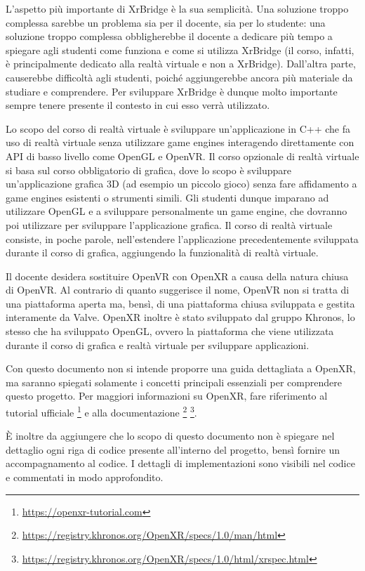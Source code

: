 \documentclass[twoside]{supsistudent}
\begin{document}
L'aspetto più importante di XrBridge è la sua semplicità. Una soluzione troppo complessa sarebbe un problema sia per il docente, sia per lo studente: una soluzione troppo complessa obbligherebbe il docente a dedicare più tempo a spiegare agli studenti come funziona e come si utilizza XrBridge (il corso, infatti, è principalmente dedicato alla realtà virtuale e non a XrBridge). Dall'altra parte, causerebbe difficoltà agli studenti, poiché aggiungerebbe ancora più materiale da studiare e comprendere. Per sviluppare XrBridge è dunque molto importante sempre tenere presente il contesto in cui esso verrà utilizzato.

Lo scopo del corso di realtà virtuale è sviluppare un'applicazione in C++ che fa uso di realtà virtuale senza utilizzare game engines interagendo direttamente con API di basso livello come OpenGL e OpenVR. Il corso opzionale di realtà virtuale si basa sul corso obbligatorio di grafica, dove lo scopo è sviluppare un'applicazione grafica 3D (ad esempio un piccolo gioco) senza fare affidamento a game engines esistenti o strumenti simili. Gli studenti dunque imparano ad utilizzare OpenGL e a sviluppare personalmente un game engine, che dovranno poi utilizzare per sviluppare l'applicazione grafica. Il corso di realtà virtuale consiste, in poche parole, nell'estendere l'applicazione precedentemente sviluppata durante il corso di grafica, aggiungendo la funzionalità di realtà virtuale.

Il docente desidera sostituire OpenVR con OpenXR a causa della natura chiusa di OpenVR. Al contrario di quanto suggerisce il nome, OpenVR non si tratta di una piattaforma aperta ma, bensì, di una piattaforma chiusa sviluppata e gestita interamente da Valve. OpenXR inoltre è stato sviluppato dal gruppo Khronos, lo stesso che ha sviluppato OpenGL, ovvero la piattaforma che viene utilizzata durante il corso di grafica e realtà virtuale per sviluppare applicazioni.

Con questo documento non si intende proporre una guida dettagliata a OpenXR, ma saranno spiegati solamente i concetti principali essenziali per comprendere questo progetto. Per maggiori informazioni su OpenXR, fare riferimento al tutorial ufficiale \footnote{\url{https://openxr-tutorial.com}} e alla documentazione \footnote{\url{https://registry.khronos.org/OpenXR/specs/1.0/man/html}} \footnote{\url{https://registry.khronos.org/OpenXR/specs/1.0/html/xrspec.html}}.

È inoltre da aggiungere che lo scopo di questo documento non è spiegare nel dettaglio ogni riga di codice presente all'interno del progetto, bensì fornire un accompagnamento al codice. I dettagli di implementazioni sono visibili nel codice e commentati in modo approfondito.
\end{document}
